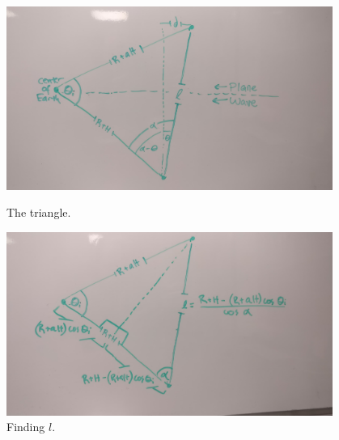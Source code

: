 \documentclass[12pt]{article}
\begin{document}
\begin{onehalfspacing}
\begin{figure}
    \centering
    \begin{minipage}{0.48\textwidth}
        \centering
        \includegraphics[width=0.95\textwidth]{prob2b-1} %
        \caption{The triangle.}
    \end{minipage}\hfill
    \begin{minipage}{0.48\textwidth}
        \centering
        \includegraphics[width=0.95\textwidth]{prob2b-2} %
        \caption{Finding $l$.}
    \end{minipage}
\end{figure}



\iffalse


\end{onehalfspacing}
\end{document}
